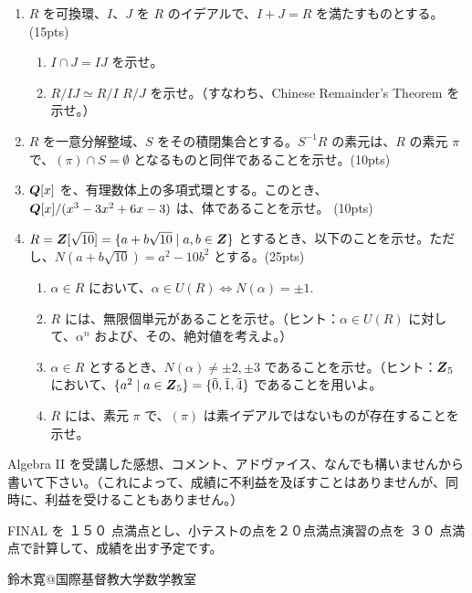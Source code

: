 \begin{enumerate}
\item $R$ を可換環、$I$、$J$ を $R$ のイデアルで、$I + J = R$ を満たすものとする。(15pts)
     \begin{enumerate}
     \item $I \cap J = IJ$ を示せ。
     \item $R/IJ \simeq R/I $ \bigx $R/J$ を示せ。（すなわち、Chinese Remainder's Theorem を示せ。）
     \end{enumerate}

\item $R$ を一意分解整域、$S$ をその積閉集合とする。$S^{-1}R$ の素元は、$R$ の素元 $\pi$ で、$(\pi)\cap S = \emptyset$ となるものと同伴であることを示せ。(10pts)
     
\item $\mbox{\boldmath $Q$}[x]$ を、有理数体上の多項式環とする。このとき、　\\
$\mbox{\boldmath $Q$}[x]/(x^3-3x^2+6x -3)$ は、体であることを示せ。 (10pts)

\item $R = \mbox{\boldmath $Z$}[\sqrt{10}] = \{a + b\sqrt{10}\mid a, b\in\mbox{\boldmath $Z$}\}$ とするとき、以下のことを示せ。ただし、$N(a + b\sqrt{10}) = a^2 - 10b^2$ とする。(25pts)
     \begin{enumerate}
     \item $\alpha\in R$ において、$\alpha\in U(R)\Leftrightarrow N(\alpha) = \pm1$.
     \item $R$ には、無限個単元があることを示せ。（ヒント：$\alpha\in U(R)$ に対して、$\alpha^n$ および、その、絶対値を考えよ。） 
     \item $\alpha\in R$ とするとき、$N(\alpha)\neq \pm 2, \pm 3$ であることを示せ。（ヒント：$\mbox{\boldmath $Z$}_5$ において、$\{a^2\mid a\in \mbox{\boldmath $Z$}_5\} = \{\bar{0},\bar{1},\bar{4}\}$ であることを用いよ。
     \item $R$ には、素元 $\pi$ で、$(\pi)$ は素イデアルではないものが存在することを示せ。
     \end{enumerate}
\end{enumerate}

 

\vspace{5ex}
\noindent Algebra II を受講した感想、コメント、アドヴァイス、なんでも構いませんから書いて下さい。（これによって、成績に不利益を及ぼすことはありませんが、同時に、利益を受けることもありません。）

\vspace{2ex}
\noindent
FINAL を １５０ 点満点とし、小テストの点を２０点満点演習の点を ３０ 点満点で計算して、成績を出す予定です。
         

\begin{flushright}
鈴木寛@国際基督教大学数学教室
\end{flushright}

